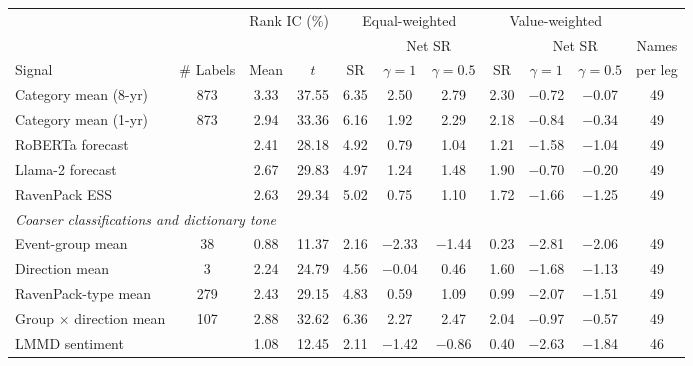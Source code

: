 \begin{table}[htbp]
{\footnotesize
\begin{adjustbox}{max width=\linewidth, max totalheight=0.75\textheight}
\begin{tabular}{lcccccccccc}
\toprule
\multicolumn{2}{c}{} & \multicolumn{2}{c}{Rank IC (\%)} & \multicolumn{3}{c}{Equal-weighted} & \multicolumn{3}{c}{Value-weighted} &  \\
\cmidrule(lr){3-4} \cmidrule(lr){5-7} \cmidrule(lr){8-10}
\multicolumn{2}{c}{} & \multicolumn{2}{c}{} &  & \multicolumn{2}{c}{Net SR} &  & \multicolumn{2}{c}{Net SR} & Names \\
\cmidrule(lr){6-7} \cmidrule(lr){9-10}
Signal & \# Labels & Mean & $t$ & SR & $\gamma=1$ & $\gamma=0.5$ & SR & $\gamma=1$ & $\gamma=0.5$ & per leg \\
\midrule
Category mean (8-yr) & 873 & 3.33 & 37.55 & 6.35 & \phantom{$-$}2.50 & \phantom{$-$}2.79 & 2.30 & $-$0.72 & $-$0.07 & 49 \\
Category mean (1-yr) & 873 & 2.94 & 33.36 & 6.16 & \phantom{$-$}1.92 & \phantom{$-$}2.29 & 2.18 & $-$0.84 & $-$0.34 & 49 \\
RoBERTa forecast &  & 2.41 & 28.18 & 4.92 & \phantom{$-$}0.79 & \phantom{$-$}1.04 & 1.21 & $-$1.58 & $-$1.04 & 49 \\
Llama-2 forecast &  & 2.67 & 29.83 & 4.97 & \phantom{$-$}1.24 & \phantom{$-$}1.48 & 1.90 & $-$0.70 & $-$0.20 & 49 \\
RavenPack ESS &  & 2.63 & 29.34 & 5.02 & \phantom{$-$}0.75 & \phantom{$-$}1.10 & 1.72 & $-$1.66 & $-$1.25 & 49 \\
\midrule
\multicolumn{11}{l}{\textit{Coarser classifications and dictionary tone}} \\
Event-group mean & \phantom{0}38 & 0.88 & 11.37 & 2.16 & $-$2.33 & $-$1.44 & 0.23 & $-$2.81 & $-$2.06 & 49 \\
Direction mean & \phantom{00}3 & 2.24 & 24.79 & 4.56 & $-$0.04 & \phantom{$-$}0.46 & 1.60 & $-$1.68 & $-$1.13 & 49 \\
RavenPack-type mean & 279 & 2.43 & 29.15 & 4.83 & \phantom{$-$}0.59 & \phantom{$-$}1.09 & 0.99 & $-$2.07 & $-$1.51 & 49 \\
Group $\times$ direction mean & 107 & 2.88 & 32.62 & 6.36 & \phantom{$-$}2.27 & \phantom{$-$}2.47 & 2.04 & $-$0.97 & $-$0.57 & 49 \\
LMMD sentiment &  & 1.08 & 12.45 & 2.11 & $-$1.42 & $-$0.86 & 0.40 & $-$2.63 & $-$1.84 & 46 \\
\bottomrule
\end{tabular}
\end{adjustbox}
}
\end{table}
